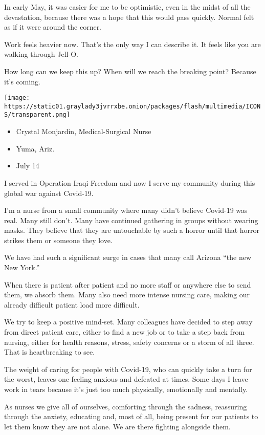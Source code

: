 In early May, it was easier for me to be optimistic, even in the midst
of all the devastation, because there was a hope that this would pass
quickly. Normal felt as if it were around the corner.

Work feels heavier now. That's the only way I can describe it. It feels
like you are walking through Jell-O.

How long can we keep this up? When will we reach the breaking point?
Because it's coming.

\texttt{[image: https://static01.graylady3jvrrxbe.onion/packages/flash/multimedia/ICONS/transparent.png]}

\begin{itemize}
\tightlist
\item
  Crystal Monjardin, Medical-Surgical Nurse
\item
  Yuma, Ariz.
\item
  July 14
\end{itemize}

I served in Operation Iraqi Freedom and now I serve my community during
this global war against Covid-19.

I'm a nurse from a small community where many didn't believe Covid-19
was real. Many still don't. Many have continued gathering in groups
without wearing masks. They believe that they are untouchable by such a
horror until that horror strikes them or someone they love.

We have had such a significant surge in cases that many call Arizona
``the new New York.''

When there is patient after patient and no more staff or anywhere else
to send them, we absorb them. Many also need more intense nursing care,
making our already difficult patient load more difficult.

We try to keep a positive mind-set. Many colleagues have decided to step
away from direct patient care, either to find a new job or to take a
step back from nursing, either for health reasons, stress, safety
concerns or a storm of all three. That is heartbreaking to see.

The weight of caring for people with Covid-19, who can quickly take a
turn for the worst, leaves one feeling anxious and defeated at times.
Some days I leave work in tears because it's just too much physically,
emotionally and mentally.

As nurses we give all of ourselves, comforting through the sadness,
reassuring through the anxiety, educating and, most of all, being
present for our patients to let them know they are not alone. We are
there fighting alongside them.

